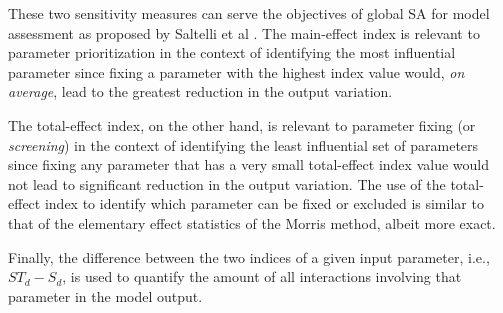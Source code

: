 These two sensitivity measures can serve the objectives of global SA for model assessment as proposed by Saltelli et al \cite{Saltelli2004,Saltelli2008}.
The main-effect index is relevant to parameter prioritization in the context of identifying the most influential parameter 
since fixing a parameter with the highest index value would, \emph{on average}, lead to 
the greatest reduction in the output variation.

The total-effect index, on the other hand, is relevant to parameter fixing (or \emph{screening}) in the context of identifying the least influential set of parameters since fixing any parameter that has a very small 
total-effect index value would not lead to significant reduction in the output variation.
The use of the total-effect index to identify which parameter can be fixed or excluded is similar to that of the elementary effect statistics of the Morris method, 
albeit more exact.

Finally, the difference between the two indices of a given input parameter, i.e., $ST_d - S_d$, 
is used to quantify the amount of all interactions involving that parameter in the model output.
